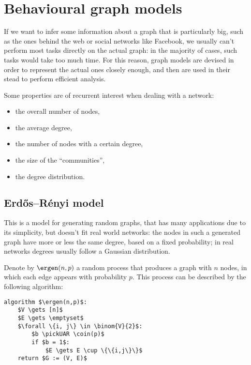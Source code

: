 \chapter{Behavioural graph models}\label{sec:users-behaviors}

If we want to infer some information about a graph that is particularly big, such as the ones behind the web or social networks like Facebook, we usually can't perform most tasks directly on the actual graph: in the majority of cases, such tasks would take too much time. For this reason, graph models are devised in order to represent the actual ones closely enough, and then are used in their stead to perform efficient analysis.

Some properties are of recurrent interest when dealing with a network:
\begin{itemize}
    \item the overall number of nodes,
    \item the average degree,
    \item the number of nodes with a certain degree,
    \item the size of the ``communities'',
    \item the degree distribution.
\end{itemize}

\section{Erd\H{o}s–Rényi model}\label{sec:gnp}
    
This is a model for generating random graphs, that has many applications due to its simplicity, but doesn't fit real world networks: the nodes in such a generated graph have more or less the same degree, based on a fixed probability; in real networks degrees usually follow a Gaussian distribution.

Denote by $\ergen(n, p)$ a random process that produces a graph with $n$ nodes, in which each edge appears with probability $p$. This process can be described by the following algorithm:

\begin{lstlisting}[caption = {The $\ergen(n,p)$ algorithm}, label = {lst:gnp}]
algorithm $\ergen(n,p)$:
    $V \gets [n]$
    $E \gets \emptyset$
    $\forall \{i, j\} \in \binom{V}{2}$:
        $b \pickUAR \coin(p)$
        if $b = 1$:
            $E \gets E \cup \{\{i,j\}\}$
    return $G := (V, E)$
\end{lstlisting}

